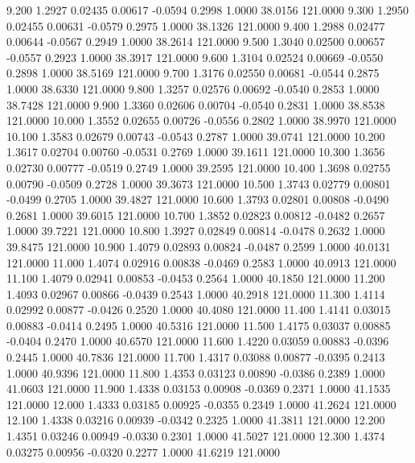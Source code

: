    9.200   1.2927   0.02435   0.00617  -0.0594   0.2998   1.0000  38.0156 121.0000
   9.300   1.2950   0.02455   0.00631  -0.0579   0.2975   1.0000  38.1326 121.0000
   9.400   1.2988   0.02477   0.00644  -0.0567   0.2949   1.0000  38.2614 121.0000
   9.500   1.3040   0.02500   0.00657  -0.0557   0.2923   1.0000  38.3917 121.0000
   9.600   1.3104   0.02524   0.00669  -0.0550   0.2898   1.0000  38.5169 121.0000
   9.700   1.3176   0.02550   0.00681  -0.0544   0.2875   1.0000  38.6330 121.0000
   9.800   1.3257   0.02576   0.00692  -0.0540   0.2853   1.0000  38.7428 121.0000
   9.900   1.3360   0.02606   0.00704  -0.0540   0.2831   1.0000  38.8538 121.0000
  10.000   1.3552   0.02655   0.00726  -0.0556   0.2802   1.0000  38.9970 121.0000
  10.100   1.3583   0.02679   0.00743  -0.0543   0.2787   1.0000  39.0741 121.0000
  10.200   1.3617   0.02704   0.00760  -0.0531   0.2769   1.0000  39.1611 121.0000
  10.300   1.3656   0.02730   0.00777  -0.0519   0.2749   1.0000  39.2595 121.0000
  10.400   1.3698   0.02755   0.00790  -0.0509   0.2728   1.0000  39.3673 121.0000
  10.500   1.3743   0.02779   0.00801  -0.0499   0.2705   1.0000  39.4827 121.0000
  10.600   1.3793   0.02801   0.00808  -0.0490   0.2681   1.0000  39.6015 121.0000
  10.700   1.3852   0.02823   0.00812  -0.0482   0.2657   1.0000  39.7221 121.0000
  10.800   1.3927   0.02849   0.00814  -0.0478   0.2632   1.0000  39.8475 121.0000
  10.900   1.4079   0.02893   0.00824  -0.0487   0.2599   1.0000  40.0131 121.0000
  11.000   1.4074   0.02916   0.00838  -0.0469   0.2583   1.0000  40.0913 121.0000
  11.100   1.4079   0.02941   0.00853  -0.0453   0.2564   1.0000  40.1850 121.0000
  11.200   1.4093   0.02967   0.00866  -0.0439   0.2543   1.0000  40.2918 121.0000
  11.300   1.4114   0.02992   0.00877  -0.0426   0.2520   1.0000  40.4080 121.0000
  11.400   1.4141   0.03015   0.00883  -0.0414   0.2495   1.0000  40.5316 121.0000
  11.500   1.4175   0.03037   0.00885  -0.0404   0.2470   1.0000  40.6570 121.0000
  11.600   1.4220   0.03059   0.00883  -0.0396   0.2445   1.0000  40.7836 121.0000
  11.700   1.4317   0.03088   0.00877  -0.0395   0.2413   1.0000  40.9396 121.0000
  11.800   1.4353   0.03123   0.00890  -0.0386   0.2389   1.0000  41.0603 121.0000
  11.900   1.4338   0.03153   0.00908  -0.0369   0.2371   1.0000  41.1535 121.0000
  12.000   1.4333   0.03185   0.00925  -0.0355   0.2349   1.0000  41.2624 121.0000
  12.100   1.4338   0.03216   0.00939  -0.0342   0.2325   1.0000  41.3811 121.0000
  12.200   1.4351   0.03246   0.00949  -0.0330   0.2301   1.0000  41.5027 121.0000
  12.300   1.4374   0.03275   0.00956  -0.0320   0.2277   1.0000  41.6219 121.0000
